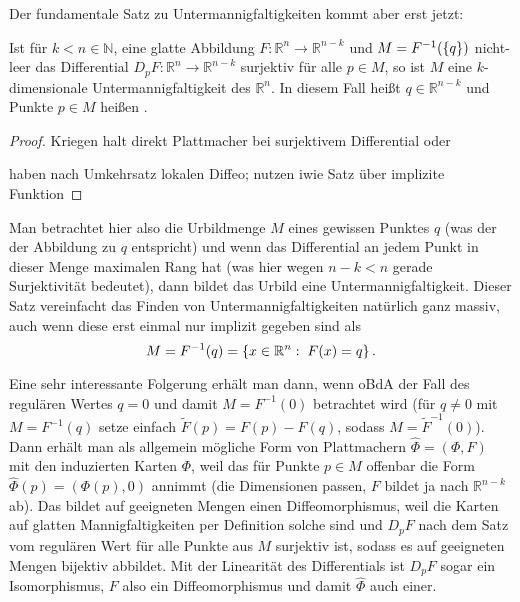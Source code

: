 \documentclass[../H_Analysis_main.tex]{subfiles}
\begin{document}
Der fundamentale Satz zu Untermannigfaltigkeiten kommt aber erst jetzt:
\begin{satz}\label{satz:satzregwert}
Ist für $k < n \in \mathbb{N}$, eine glatte Abbildung $F: \mathbb{R}^n \rightarrow \mathbb{R}^{n - k}$ und $M = F^{-1}(\qty{q})$ nicht-leer das Differential $D_p F: \mathbb{R}^n \rightarrow \mathbb{R}^{n - k}$ surjektiv für alle $p \in M$, so ist $M$ eine $k$-dimensionale Untermannigfaltigkeit des $\mathbb{R}^n$. In diesem Fall heißt $q \in \mathbb{R}^{n - k}$  und Punkte $p \in M$ heißen .
\end{satz}
\begin{proof}
Kriegen halt direkt Plattmacher bei surjektivem Differential oder

haben nach Umkehrsatz lokalen Diffeo; nutzen iwie Satz über implizite Funktion
\end{proof}

Man betrachtet hier also die Urbildmenge $M$ eines gewissen Punktes $q$ (was der  der Abbildung zu $q$ entspricht) und wenn das Differential an jedem Punkt in dieser Menge maximalen Rang hat (was hier wegen $n - k < n$ gerade Surjektivität bedeutet), dann bildet das Urbild eine Untermannigfaltigkeit. Dieser Satz vereinfacht das Finden von Untermannigfaltigkeiten natürlich ganz massiv, auch wenn diese erst einmal nur implizit gegeben sind als
\begin{equation}
M = F^{-1}(q) = \qty{x \in \mathbb{R}^n: \; F(x) = q} \, .
\end{equation}


Eine sehr interessante Folgerung erhält man dann, wenn oBdA der Fall des regulären Wertes $q = 0$ und damit $M = F^{-1}(0)$ betrachtet wird (für $q \neq 0$ mit $M = F^{-1}(q)$ setze einfach $\tilde{F}(p) = F(p) - F(q)$, sodass $M = \tilde{F}^{-1}(0)$). Dann erhält man als allgemein mögliche Form von Plattmachern $\hat{\Phi} = (\Phi, F)$ mit den induzierten Karten $\Phi$, weil das für Punkte $p \in M$ offenbar die Form $\hat{\Phi}(p) = (\Phi(p), 0)$ annimmt (die Dimensionen passen, $F$ bildet ja nach $\mathbb{R}^{n - k}$ ab). Das bildet auf geeigneten Mengen einen Diffeomorphismus, weil die Karten auf glatten Mannigfaltigkeiten per Definition solche sind und $D_p F$ nach dem Satz vom regulären Wert für alle Punkte aus $M$ surjektiv ist, sodass es auf geeigneten Mengen bijektiv abbildet. Mit der Linearität des Differentials ist $D_p F$ sogar ein Isomorphismus, $F$ also ein Diffeomorphismus und damit $\hat{\Phi}$ auch einer.\\
\end{document}
